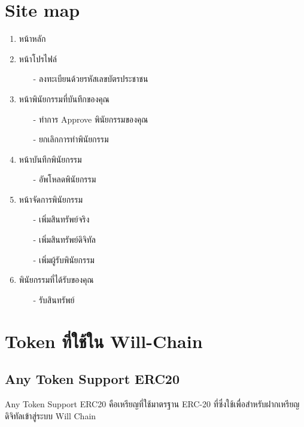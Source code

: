 \documentclass[12pt,oneside,openright,a4paper]{cpe-thai-project}
\begin{document}
\section{Site map}
\begin{enumerate}[label=\thesection.\arabic*,leftmargin=0pt,itemindent=1.25cm]
	\item หน้าหลัก
	\item หน้าโปรไฟล์
	\begin{itemize}[leftmargin=0pt,itemindent=1.25cm]
		\item[-] ลงทะเบียนด้วยรหัสเลขบัตรประชาชน
	\end{itemize}
	\item หน้าพินัยกรรมที่บันทึกของคุณ
	\begin{itemize}[leftmargin=0pt,itemindent=1.25cm]
		\item[-] ทำการ Approve พินัยกรรมของคุณ
		\item[-] ยกเลิกการทำพินัยกรรม
	\end{itemize}
	\item หน้าบันทึกพินัยกรรม 
	\begin{itemize}[leftmargin=0pt,itemindent=1.25cm]
		\item[-] อัพโหลดพินัยกรรม
	\end{itemize}
	\item หน้าจัดการพินัยกรรม
	\begin{itemize}[leftmargin=0pt,itemindent=1.25cm]
		\item[-] เพิ่มสินทรัพย์จริง
		\item[-] เพิ่มสินทรัพย์ดิจิทัล
		\item[-] เพิ่มผู้รับพินัยกรรม
	\end{itemize}
	\item พินัยกรรมที่ได้รับของคุณ
	\begin{itemize}[leftmargin=0pt,itemindent=1.25cm]
		\item[-] รับสินทรัพย์
	\end{itemize}
\end{enumerate}
\section{Token ที่ใช้ใน Will-Chain}
\subsection{Any Token Support ERC20}
		\tab Any Token Support ERC20 คือเหรียญที่ใช้มาตรฐาน ERC-20 ที่ซึ่งใช้เพื่อสำหรับฝากเหรียญดิจิทัลเข้าสู่ระบบ Will Chain
		
\end{document}
